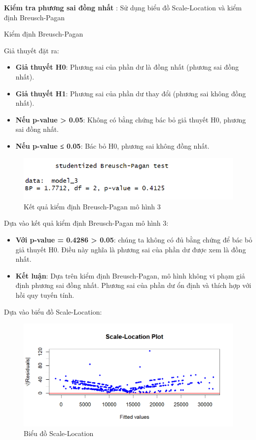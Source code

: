 \textbf{Kiểm tra phương sai đồng nhất }: Sử dụng biểu đồ Scale-Location và kiểm định Breusch-Pagan

Kiểm định Breusch-Pagan

Giả thuyết đặt ra:
\begin{itemize}
  \item\textbf{Giả thuyết H0}: Phương sai của phần dư là đồng nhất (phương sai đồng nhất).
  \item\textbf{Giả thuyết H1}: Phương sai của phần dư thay đổi (phương sai không đồng nhất).
  \item\textbf{Nếu p-value > 0.05}: Không có bằng chứng bác bỏ giả thuyết H0, phương sai đồng nhất.
  \item\textbf{Nếu p-value ≤ 0.05}: Bác bỏ H0, phương sai không đồng nhất.
\end{itemize}

\begin{figure}[!htp]
  \centering
  \includegraphics[width=0.7\linewidth]{graphics/5.5.10.png}
  \caption{Kết quả kiểm định Breusch-Pagan mô hình 3 }
\end{figure}

Dựa vào kết quả kiểm định Breusch-Pagan mô hình 3:
\begin{itemize}
\item\textbf{Với p-value = 0.4286 > 0.05}: chúng ta không có đủ bằng chứng để bác bỏ giả thuyết H0. Điều này nghĩa là phương sai của phần dư được xem là đồng nhất.
\item\textbf{Kết luận}: Dựa trên kiểm định Breusch-Pagan, mô hình không vi phạm giả định phương sai đồng nhất. Phương sai của phần dư ổn định và thích hợp với hồi quy tuyến tính.
\end{itemize}

Dựa vào biểu đồ Scale-Location:

\begin{figure}[H]
  \centering
  \includegraphics[width=0.7\linewidth]{graphics/5.5.11.png}
  \caption{Biểu đồ Scale-Location }
\end{figure}

